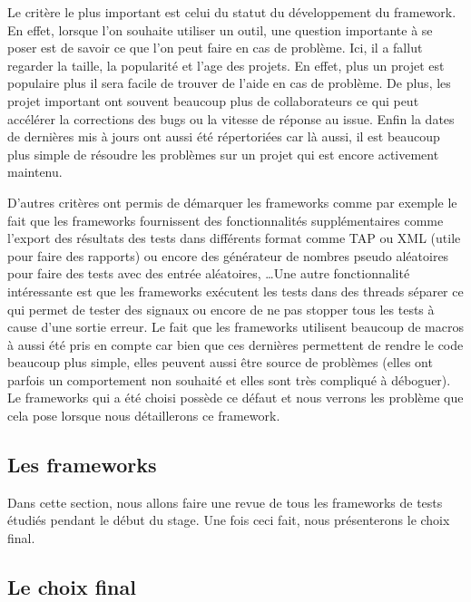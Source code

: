\documentclass[a4paper]{article}
\begin{document}
Le critère le plus important est celui du statut du développement du framework.
En effet, lorsque l'on souhaite utiliser un outil, une question importante à se
poser est de savoir ce que l'on peut faire en cas de problème. Ici, il a fallut
regarder la taille, la popularité et l'age des projets. En effet, plus un projet
est populaire plus il sera facile de trouver de l'aide en cas de problème. De
plus, les projet important ont souvent beaucoup plus de collaborateurs ce qui
peut accélérer la corrections des bugs ou la vitesse de réponse au issue. Enfin
la dates de dernières mis à jours ont aussi été répertoriées car là aussi, il
est beaucoup plus simple de résoudre les problèmes sur un projet qui est encore
activement maintenu.

D'autres critères ont permis de démarquer les frameworks comme par exemple le
fait que les frameworks fournissent des fonctionnalités supplémentaires comme
l'export des résultats des tests dans différents format comme TAP ou XML (utile
pour faire des rapports) ou encore des générateur de nombres pseudo aléatoires
pour faire des tests avec des entrée aléatoires, \dots Une autre fonctionnalité
intéressante est que les frameworks exécutent les tests dans des threads séparer
ce qui permet de tester des signaux ou encore de ne pas stopper tous les tests à
cause d'une sortie erreur. Le fait que les frameworks utilisent beaucoup de
macros à aussi été pris en compte car bien que ces dernières permettent de
rendre le code beaucoup plus simple, elles peuvent aussi être source de
problèmes (elles ont parfois un comportement non souhaité et elles sont très
compliqué à déboguer). Le frameworks qui a été choisi possède ce défaut et nous
verrons les problème que cela pose lorsque nous détaillerons ce framework.

\subsection{Les frameworks}

Dans cette section, nous allons faire une revue de tous les frameworks de tests
étudiés pendant le début du stage. Une fois ceci fait, nous présenterons le
choix final.


\subsubsection{}

\subsection{Le choix final}
\end{document}
